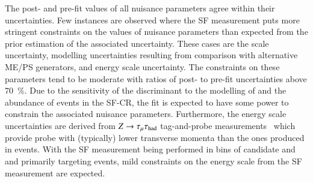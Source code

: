 The post- and pre-fit values of all nuisance parameters agree within their
uncertainties. Few instances are observed where the SF measurement puts more
stringent constraints on the values of nuisance parameters than expected from
the prior estimation of the associated uncertainty. These cases are the
\pTmissAbs scale uncertainty, \ttbar modelling uncertainties resulting from
comparison with alternative ME/PS generators, and \tauhadvis energy scale
uncertainty. The constraints on these parameters tend to be moderate with ratios
of post- to pre-fit uncertainties above \SI{70}{\percent}. Due to the
sensitivity of the \mTW discriminant to the modelling of \pTmissAbs and the
abundance of \ttbar events in the SF-CR, the fit is expected to have some power
to constrain the associated nuisance parameters. Furthermore, the \tauhadvis
energy scale uncertainties are derived from $Z \rightarrow \tau_{\mu} \tau_{\text{had}}$
tag-and-probe measurements~\cite{ATLAS-CONF-2017-029} which provide probe
\tauhadvis with (typically) lower transverse momenta than the ones produced in
\ttbar events. With the SF measurement being performed in bins of \tauhadvis
candidate \Ntracks and \pT and primarily targeting \ttbar events, mild
constraints on the \tauhadvis energy scale from the SF measurement are expected.





